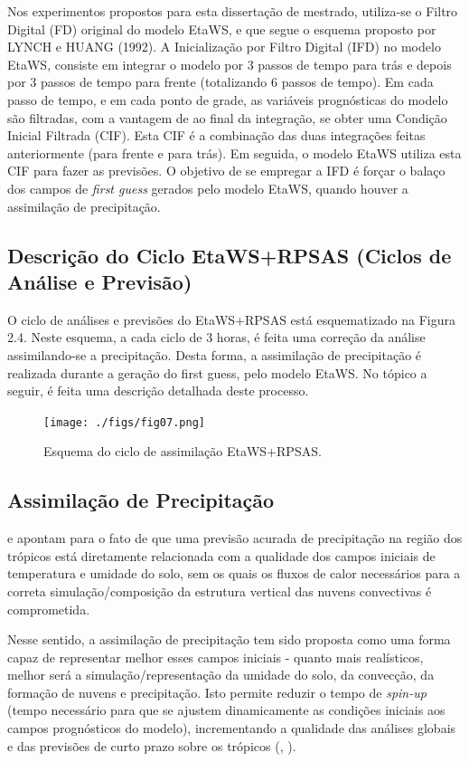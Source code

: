 Nos experimentos propostos para esta dissertação de mestrado, utiliza-se o Filtro Digital (FD) original do modelo EtaWS, e que segue o esquema proposto por LYNCH e HUANG (1992). A Inicialização por Filtro Digital (IFD) no modelo EtaWS, consiste em integrar o modelo por 3 passos de tempo para trás e depois por 3 passos de tempo para frente (totalizando 6 passos de tempo). Em cada passo de tempo, e em cada ponto de grade, as variáveis prognósticas do modelo são filtradas, com a vantagem de ao final da integração, se obter uma Condição Inicial Filtrada (CIF). Esta CIF é a combinação das duas integrações feitas anteriormente (para frente e para trás). Em seguida, o modelo EtaWS utiliza esta CIF para fazer as previsões. O objetivo de se empregar a IFD é forçar o balaço dos campos de \textit{first guess} gerados pelo modelo EtaWS, quando houver a assimilação de precipitação.

\subsection{Descrição do Ciclo EtaWS+RPSAS (Ciclos de Análise e Previsão)}

O ciclo de análises e previsões do EtaWS+RPSAS está esquematizado na Figura 2.4. Neste esquema, a cada ciclo de 3 horas, é feita uma correção da análise assimilando-se a precipitação. Desta forma, a assimilação de precipitação é realizada durante a geração do first guess, pelo modelo EtaWS. No tópico a seguir, é feita uma descrição detalhada deste processo.

\begin{figure}
	\centering
		\texttt{[image: ./figs/fig07.png]}
	  \caption{Esquema do ciclo de assimilação EtaWS+RPSAS.}
	 \label{fig07}
\end{figure}

\subsection{Assimilação de Precipitação}

\cite{krishnamurty1991} e \cite{nunesroads2005} apontam para o fato de que uma previsão acurada de precipitação na região dos trópicos está diretamente relacionada com a qualidade dos campos iniciais de temperatura e umidade do solo, sem os quais os fluxos de calor necessários para a correta simulação/composição da estrutura vertical das nuvens convectivas é comprometida.

Nesse sentido, a assimilação de precipitação tem sido proposta como uma forma capaz de representar melhor esses campos iniciais - quanto mais realísticos, melhor será a simulação/representação da umidade do solo, da convecção, da formação de nuvens e precipitação. Isto permite reduzir o tempo de \textit{spin-up} (tempo necessário para que se ajustem dinamicamente as condições iniciais aos campos prognósticos do modelo), incrementando a qualidade das análises globais e das previsões de curto prazo sobre os trópicos (\cite{heckley1990}, \cite{falkovich2000}).

